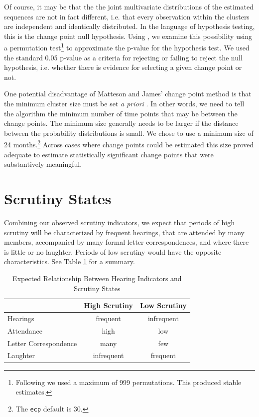 \documentclass[a4paper]{article}\usepackage[]{graphicx}\usepackage[]{color}
\begin{document}
Of course, it may be that the the joint multivariate distributions of the estimated sequences are not in fact different, i.e. that every observation within the clusters are independent and identically distributed. In the language of hypothesis testing, this is the change point null hypothesis. Using \cite{Matteson2012}, we examine this possibility using a permutation test\footnote{Following \cite{Rizzo2010} we used a maximum of 999 permutations. This produced stable estimates.} to approximate the p-value for the hypothesis test. We used the standard 0.05 p-value as a criteria for rejecting or failing to reject the null hypothesis, i.e. whether there is evidence for selecting a given change point or not.

One potential disadvantage of Matteson and James' change point method is that the minimum cluster size must be set \emph{a priori} \citeyearpar[11]{Matteson2012}. In other words, we need to tell the algorithm the minimum number of time points that may be between the change points. The minimum size generally needs to be larger if the distance between the probability distributions is small. We chose to use a minimum size of 24 months.\footnote{The \texttt{ecp} default is 30.} Across cases where change points could be estimated this size proved adequate to estimate statistically significant change points that were substantively meaningful.

\section{Scrutiny States}

Combining our observed scrutiny indicators, we expect that periods of high scrutiny will be characterized by frequent hearings, that are attended by many members, accompanied by many formal letter correspondences, and where there is little or no laughter. Periods of low scrutiny would have the opposite characteristics. See Table \ref{ExpectedTable} for a summary.

\begin{table}
  \caption{Expected Relationship Between Hearing Indicators and Scrutiny States}
  \label{ExpectedTable}
  \begin{center}
    \begin{tabular}{l | c c}
      \hline
      & High Scrutiny & Low Scrutiny \\
      \hline \hline
      Hearings & frequent & infrequent \\[0.25cm]
      Attendance & high & low \\[0.25cm]
      Letter Correspondence & many & few \\[0.25cm]
      Laughter & infrequent & frequent \\
      \hline
    \end{tabular}
  \end{center}
\end{table}
\end{document}
